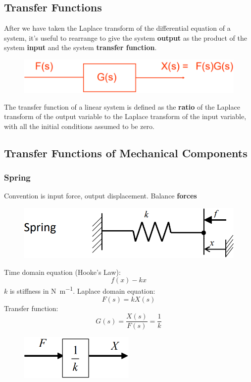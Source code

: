 \documentclass[class=report, crop=false, 12pt,a4paper, tikz, border=4mm]{standalone}
\begin{document}
\subsection{Transfer Functions}
After we have taken the Laplace transform of the differential equation of a system, it's useful to rearrange to give the system \textbf{output} as the product of the system \textbf{input} and the system \textbf{transfer function}.
\begin{figure}[H]
  \centering
  \includegraphics[width = 0.8 \textwidth]{../img/blockdiagram11.png}
\end{figure}
The transfer function of a linear system is defined as the \textbf{ratio} of the Laplace transform of the output variable to the Laplace transform of the input variable, with all the initial conditions assumed to be zero. 
\subsection{Transfer Functions of Mechanical Components}
\subsubsection{Spring}
Convention is input force, output displacement. Balance \textbf{forces}
\begin{figure}[H]
  \centering
  \includegraphics[width = 0.8 \textwidth]{../img/diagram1.png}
\end{figure}
Time domain equation (Hooke's Law): 
\begin{equation}
  f(x) - kx
\end{equation}
$k$ is stiffness in \si{\newton\per\meter}. Laplace domain equation:
\begin{equation}
  F(s) = kX(s)
\end{equation}
Transfer function:
\begin{equation}
  G(s) = \frac{X(s)}{F(s)} = \frac{1}{k}
\end{equation}
\begin{figure}[H]
  \centering
  \includegraphics[width = 0.5\textwidth]{../img/blockdiagram12.png}
\end{figure}
\end{document}

